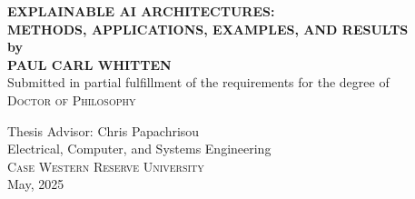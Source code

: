\documentclass[12pt, oneside]{book}
\begin{document}


\begin{titlepage}
\begin{center}
\Large{\bfseries\MakeUppercase{
    Explainable AI Architectures:\\Methods, Applications, Examples, and Results\\
 }}
 \vspace{.5cm}
 \large{\bfseries{by}}\\ \vspace{.5cm}
 \vspace{.5cm}
\Large{\bfseries\MakeUppercase{Paul Carl Whitten}}\\

\vspace{1cm}
\large{Submitted in partial fulfillment of the requirements for the degree of} \\[0.5cm]
\textsc{\Large{{Doctor of Philosophy}}} \\[5pt]
\vfill

{Thesis Advisor: Chris Papachrisou} \vspace{0.4cm} \\[2cm]

 \vfill
\large{Electrical, Computer, and Systems Engineering}\\[5pt]
\textsc{Case Western Reserve University}\\[0.5cm]

{May, 2025}
\end{center}
\end{titlepage}
\end{document}
